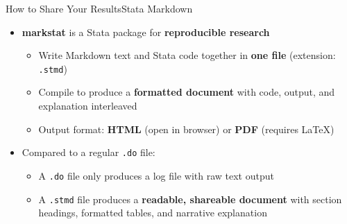 \documentclass[dvipsnames,hyperref={pdfpagelabels=false}]{beamer}
\begin{document}
\begin{frame}{How to Share Your Results}{Stata Markdown}

	\begin{itemize}
		\item \textbf{markstat} is a Stata package for \textbf{reproducible research}
		\vspace{0.3cm}
		\begin{itemize}
			\item Write Markdown text and Stata code together in \textbf{one file} (extension: \texttt{.stmd})
			\vspace{0.2cm}
			\item Compile to produce a \textbf{formatted document} with code, output, and explanation interleaved
			\vspace{0.2cm}
			\item Output format: \textbf{HTML} (open in browser) or \textbf{PDF} (requires \LaTeX)
		\end{itemize}
		\vspace{0.3cm}
		\item Compared to a regular \texttt{.do} file:
		\vspace{0.2cm}
		\begin{itemize}
			\item A \texttt{.do} file only produces a log file with raw text output
			\vspace{0.2cm}
			\item A \texttt{.stmd} file produces a \textbf{readable, shareable document} with section headings, formatted tables, and narrative explanation
		\end{itemize}
	\end{itemize}

\end{frame}
\end{document}

